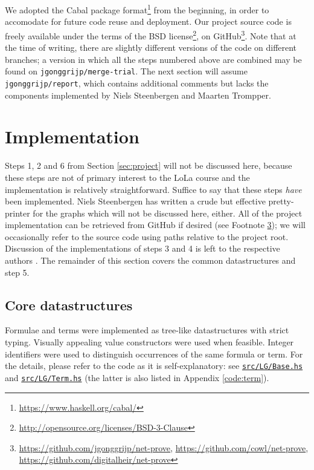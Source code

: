 \documentclass[12pt,a4paper]{article}
\newcommand{\coderef}[1]{\href{https://github.com/jgonggrijp/net-prove/blob/report/#1}{\texttt{#1}}}
\begin{document}
We adopted the Cabal package format\footnote{\url{https://www.haskell.org/cabal/}} from the beginning, in order to accomodate for future code reuse and deployment. Our project source code is freely available under the terms of the BSD license\footnote{\url{http://opensource.org/licenses/BSD-3-Clause}}, on GitHub\footnote{\url{https://github.com/jgonggrijp/net-prove}, \url{https://github.com/cowl/net-prove}, \url{https://github.com/digitalheir/net-prove}\label{ftn:github}}. Note that at the time of writing, there are slightly different versions of the code on different branches; a version in which all the steps numbered above are combined may be found on \texttt{jgonggrijp/merge-trial}. The next section will assume \texttt{jgonggrijp/report}, which contains additional comments but lacks the components implemented by Niels Steenbergen and Maarten Trompper.


\section{Implementation}

Steps 1, 2 and 6 from Section \ref{sec:project} will not be discussed here, because these steps are not of primary interest to the LoLa course and the implementation is relatively straightforward. Suffice to say that these steps \emph{have} been implemented. Niels Steenbergen has written a crude but effective pretty-printer for the graphs which will not be discussed here, either. All of the project implementation can be retrieved from GitHub if desired (see Footnote \ref{ftn:github}); we will occasionally refer to the source code using paths relative to the project root. Discussion of the implementations of steps 3 and 4 is left to the respective authors \cite{maarten,niels}. The remainder of this section covers the common datastructures and step 5.


\subsection{Core datastructures}

Formulae and terms were implemented as tree-like datastructures with strict typing. Visually appealing value constructors were used when feasible. Integer identifiers were used to distinguish occurrences of the same formula or term. For the details, please refer to the code as it is self-explanatory: see \coderef{src/LG/Base.hs} and \coderef{src/LG/Term.hs} (the latter is also listed in Appendix \ref{code:term}).
\end{document}
